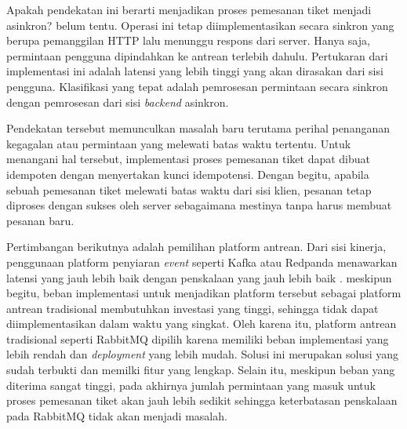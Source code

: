 Apakah pendekatan ini berarti menjadikan proses pemesanan tiket menjadi asinkron? belum tentu. Operasi ini tetap diimplementasikan secara sinkron yang berupa pemanggilan HTTP lalu menunggu respons dari server. Hanya saja, permintaan pengguna dipindahkan ke antrean terlebih dahulu. Pertukaran dari implementasi ini adalah latensi yang lebih tinggi yang akan dirasakan dari sisi pengguna. Klasifikasi yang tepat adalah pemrosesan permintaan secara sinkron dengan pemrosesan dari sisi \textit{backend} asinkron.

Pendekatan tersebut memunculkan masalah baru terutama perihal penanganan kegagalan atau permintaan yang melewati batas waktu tertentu. Untuk menangani hal tersebut, implementasi proses pemesanan tiket dapat dibuat idempoten dengan menyertakan kunci idempotensi. Dengan begitu, apabila sebuah pemesanan tiket melewati batas waktu dari sisi klien, pesanan tetap diproses dengan sukses oleh server sebagaimana mestinya tanpa harus membuat pesanan baru.

Pertimbangan berikutnya adalah pemilihan platform antrean. Dari sisi kinerja, penggunaan platform penyiaran \textit{event} seperti Kafka atau Redpanda menawarkan latensi yang jauh lebih baik dengan penskalaan yang jauh lebih baik \parencite{comparingKafkaAlternatives}. meskipun begitu, beban implementasi untuk menjadikan platform tersebut sebagai platform antrean tradisional membutuhkan investasi yang tinggi, sehingga tidak dapat diimplementasikan dalam waktu yang singkat. Oleh karena itu, platform antrean tradisional seperti RabbitMQ dipilih karena memiliki beban implementasi yang lebih rendah dan \textit{deployment} yang lebih mudah. Solusi ini merupakan solusi yang sudah terbukti dan memilki fitur yang lengkap. Selain itu, meskipun beban yang diterima sangat tinggi, pada akhirnya jumlah permintaan yang masuk untuk proses pemesanan tiket akan jauh lebih sedikit sehingga keterbatasan penskalaan pada RabbitMQ tidak akan menjadi masalah.

